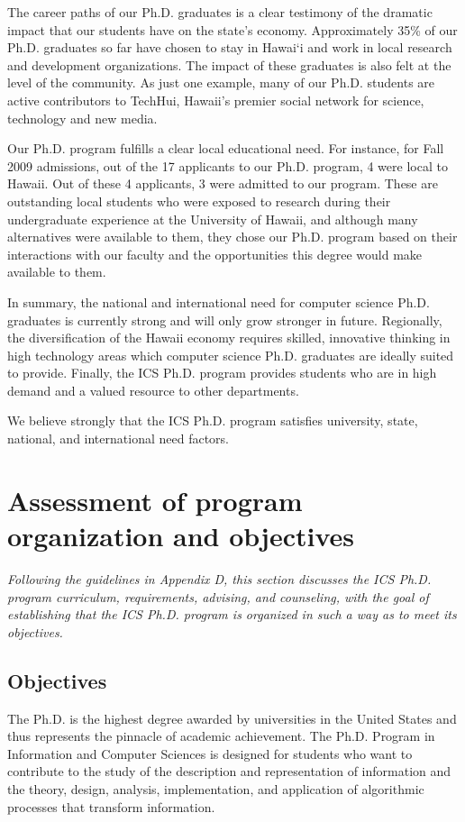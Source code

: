 \documentclass[12pt]{article}
\begin{document}
The career paths of our Ph.D. graduates is a clear testimony of the
dramatic impact that our students have on the state's
economy. Approximately 35\% of our Ph.D. graduates so far have chosen to
stay in Hawai`i and work in local research and development organizations.
The impact of these graduates is also felt at the level of the community.
As just one example, many of our Ph.D. students are active contributors to
TechHui, Hawaii's premier social network for science, technology and new
media.

Our Ph.D. program fulfills a clear local educational need. For instance,
for Fall 2009 admissions, out of the 17 applicants to our Ph.D. program, 4
were local to Hawaii.  Out of these 4 applicants, 3 were admitted to our
program. These are outstanding local students who were exposed to research
during their undergraduate experience at the University of Hawaii, and
although many alternatives were available to them, they chose our
Ph.D. program based on their interactions with our faculty and the
opportunities this degree would make available to them.

In summary, the national and international need for computer science
Ph.D. graduates is currently strong and will only grow stronger in future.
Regionally, the diversification of the Hawaii economy requires skilled,
innovative thinking in high technology areas which computer science
Ph.D. graduates are ideally suited to provide.  Finally, the ICS
Ph.D. program provides students who are in high demand and a valued
resource to other departments.   

We believe strongly that the ICS Ph.D. program satisfies university, state,
national, and international need factors. 

\section{Assessment of program organization and objectives}

{\em Following the guidelines in Appendix D, this section discusses the ICS
  Ph.D. program curriculum, requirements, advising, and counseling, with
  the goal of establishing that the ICS Ph.D. program is organized in such
  a way as to meet its objectives. }

\subsection{Objectives}

The Ph.D. is the highest degree awarded by universities in the United
States and thus represents the pinnacle of academic achievement.  The Ph.D.
Program in Information and Computer Sciences is designed for students who
want to contribute to the study of the description and representation of
information and the theory, design, analysis, implementation, and
application of algorithmic processes that transform information.
\end{document}

